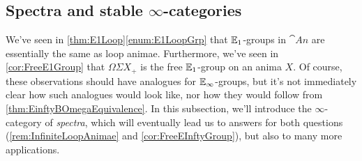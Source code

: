 \subsection{Spectra and stable \texorpdfstring{$\infty$}{Infinity}-categories}\label{subsec:Spectra}
We've seen in \cref{thm:E1Loop}\cref{enum:E1LoopGrp} that $\mathbb{E}_1$-groups in $\cat{An}$ are essentially the same as loop animae. Furthermore, we've seen in \cref{cor:FreeE1Group} that $\Omega\Sigma X_+$ is the free $\mathbb{E}_1$-group on an anima $X$. Of course, these observations should have analogues for $\mathbb{E}_\infty$-groups, but it's not immediately clear how such analogues would look like, nor how they would follow from \cref{thm:EinftyBOmegaEquivalence}.  In this subsection, we'll introduce the $\infty$-category of \emph{spectra}, which will eventually lead us to answers for both questions (\cref{rem:InfiniteLoopAnimae} and \cref{cor:FreeEInftyGroup}), but also to many more applications.
